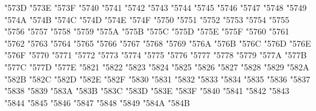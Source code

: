 {\Uchar\jis"573D %
\Uchar\jis"573E %
\Uchar\jis"573F %
\Uchar\jis"5740 %
\Uchar\jis"5741 %
\Uchar\jis"5742 %
\Uchar\jis"5743 %
\Uchar\jis"5744 %
\Uchar\jis"5745 %
\Uchar\jis"5746 %
\Uchar\jis"5747 %
\Uchar\jis"5748 %
\Uchar\jis"5749 %
\Uchar\jis"574A %
\Uchar\jis"574B %
\Uchar\jis"574C %
\Uchar\jis"574D %
\Uchar\jis"574E %
\Uchar\jis"574F %
\Uchar\jis"5750 %
\Uchar\jis"5751 %
\Uchar\jis"5752 %
\Uchar\jis"5753 %
\Uchar\jis"5754 %
\Uchar\jis"5755 %
\Uchar\jis"5756 %
\Uchar\jis"5757 %
\Uchar\jis"5758 %
\Uchar\jis"5759 %
\Uchar\jis"575A %
\Uchar\jis"575B %
\Uchar\jis"575C %
\Uchar\jis"575D %
\Uchar\jis"575E %
\Uchar\jis"575F %
\Uchar\jis"5760 %
\Uchar\jis"5761 %
\Uchar\jis"5762 %
\Uchar\jis"5763 %
\Uchar\jis"5764 %
\Uchar\jis"5765 %
\Uchar\jis"5766 %
\Uchar\jis"5767 %
\Uchar\jis"5768 %
\Uchar\jis"5769 %
\Uchar\jis"576A %
\Uchar\jis"576B %
\Uchar\jis"576C %
\Uchar\jis"576D %
\Uchar\jis"576E %
\Uchar\jis"576F %
\Uchar\jis"5770 %
\Uchar\jis"5771 %
\Uchar\jis"5772 %
\Uchar\jis"5773 %
\Uchar\jis"5774 %
\Uchar\jis"5775 %
\Uchar\jis"5776 %
\Uchar\jis"5777 %
\Uchar\jis"5778 %
\Uchar\jis"5779 %
\Uchar\jis"577A %
\Uchar\jis"577B %
\Uchar\jis"577C %
\Uchar\jis"577D %
\Uchar\jis"577E %
\Uchar\jis"5821 %
\Uchar\jis"5822 %
\Uchar\jis"5823 %
\Uchar\jis"5824 %
\Uchar\jis"5825 %
\Uchar\jis"5826 %
\Uchar\jis"5827 %
\Uchar\jis"5828 %
\Uchar\jis"5829 %
\Uchar\jis"582A %
\Uchar\jis"582B %
\Uchar\jis"582C %
\Uchar\jis"582D %
\Uchar\jis"582E %
\Uchar\jis"582F %
\Uchar\jis"5830 %
\Uchar\jis"5831 %
\Uchar\jis"5832 %
\Uchar\jis"5833 %
\Uchar\jis"5834 %
\Uchar\jis"5835 %
\Uchar\jis"5836 %
\Uchar\jis"5837 %
\Uchar\jis"5838 %
\Uchar\jis"5839 %
\Uchar\jis"583A %
\Uchar\jis"583B %
\Uchar\jis"583C %
\Uchar\jis"583D %
\Uchar\jis"583E %
\Uchar\jis"583F %
\Uchar\jis"5840 %
\Uchar\jis"5841 %
\Uchar\jis"5842 %
\Uchar\jis"5843 %
\Uchar\jis"5844 %
\Uchar\jis"5845 %
\Uchar\jis"5846 %
\Uchar\jis"5847 %
\Uchar\jis"5848 %
\Uchar\jis"5849 %
\Uchar\jis"584A %
\Uchar\jis"584B %
}
